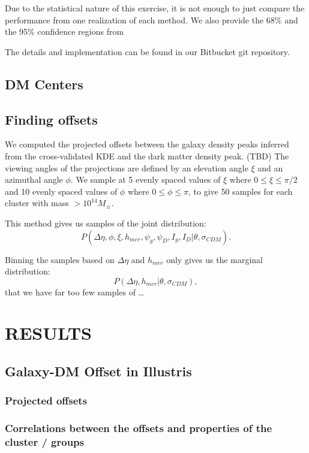 \documentclass[letterpaper,useAMS,usenatbib]{mn2e}
\begin{document}
Due to the statistical nature of this exercise, it is not enough to just
compare the performance from one realization of each method. We also provide
the 68\% and the 95\% confidence regions from 


The details and implementation can be found in our Bitbucket git repository.



\subsection{DM Centers}
\subsection{Finding offsets} 

We computed the projected offsets between the galaxy density peaks inferred from the
cross-validated KDE and the dark matter density peak. (TBD) 
The viewing angles of the projections are defined by an elevation angle
$\xi$ and an azimuthal angle $\phi$. 
We sample at 5 evenly spaced values of $\xi$ where $0 \leq \xi \leq \pi / 2$ and 
10 evenly spaced values of $\phi$ where $0 \leq \phi \leq \pi$, to give 50
samples for each cluster with mass $> 10^{14} M_\sun$. 

This method gives us samples of the joint distribution: 
\begin{equation}
	P(\Delta \eta, \phi, \xi, h_{mer}, \psi_g, \psi_D, I_g, I_D | \theta,
	\sigma_{CDM}). 
\end{equation}


Binning the samples based on $\Delta \eta$ and $h_{mer}$ only gives us the
marginal distribution:
\begin{equation}
	P(\Delta \eta, h_{mer} | \theta, \sigma_{CDM}),
\end{equation}
that we have far too few samples of \dots


\section{RESULTS} 

\subsection{Galaxy-DM Offset in Illustris}
\subsubsection{Projected offsets}
\subsubsection{Correlations between the offsets and properties of the cluster / groups}
\end{document}
